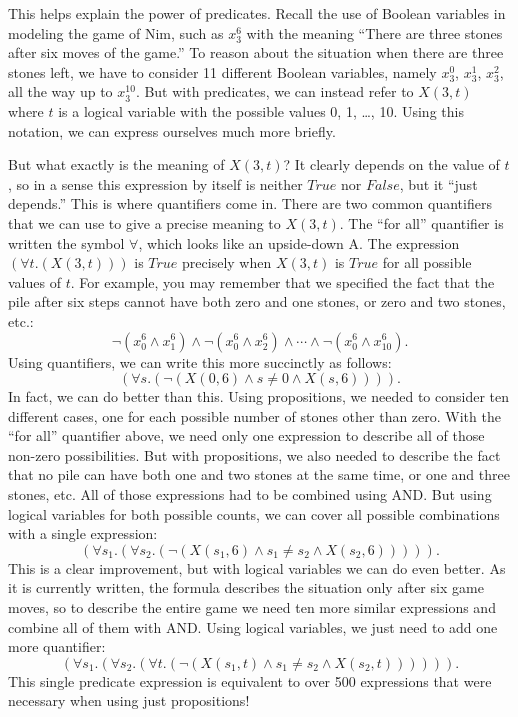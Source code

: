 This helps explain the power of predicates. Recall the use of Boolean variables in modeling the game of Nim, such as $x_{3}^{6}$
with the meaning ``There are three stones after six moves of the game.'' To reason about the situation when there are three
stones left, we have to consider 11 different Boolean variables, namely $x_{3}^{0}$, $x_{3}^{1}$, $x_{3}^{2}$, all the way 
up to $x_{3}^{10}$. But with predicates, we can instead refer to $X(3, t)$ where $t$ is a logical variable with the possible
values 0, 1, \dots, 10. Using this notation, we can express ourselves much more briefly.

But what exactly is the meaning of $X(3, t)$? It clearly depends on the value of $t$, so in a sense this expression by
itself is neither $True$ nor $False$, but it ``just depends.'' This is where quantifiers come in. There are two common
quantifiers that we can use to give a precise meaning to $X(3, t)$. The ``for all'' quantifier is written the symbol
$\forall$, which looks like an upside-down A. The expression $(\forall t.(X(3, t)))$ is $True$ precisely when $X(3, t)$
is $True$ for all possible values of $t$. 
For example, you may remember that we specified the fact that the pile after six steps
cannot have both zero and one stones, or zero and two stones, etc.:
$$\neg(x_{0}^{6} \wedge x_{1}^{6}) \wedge \neg(x_{0}^{6} \wedge x_{2}^{6}) \wedge \cdots \wedge \neg(x_{0}^{6} \wedge x_{10}^{6}).$$
Using quantifiers, we can write this more succinctly as follows:
$$(\forall s.(\neg(X(0, 6) \wedge s\ne0 \wedge X(s, 6)))).$$
In fact, we can do better than this. Using propositions, we needed to consider ten
different cases, one for each possible number of stones other than zero. With the 
``for all'' quantifier above, we need only one expression to describe all of those 
non-zero possibilities. But with propositions, we also needed to describe the fact
that no pile can have both one and two stones at the same time, or one and three
stones, etc.  All of those expressions had to be combined using AND. But using
logical variables for both possible counts, we can cover all possible combinations 
with a single expression:
$$(\forall s_1.(\forall s_2.(\neg(X(s_1, 6) \wedge s_1 \ne s_2 \wedge X(s_2, 6))))).$$
This is a clear improvement, but with logical variables we can do even better. As it
is currently written, the formula describes the situation only after six game moves,
so to describe the entire game we need ten more similar expressions and combine all
of them with AND. Using logical variables, we just need to add one more quantifier:
$$(\forall s_1.(\forall s_2.(\forall t.(\neg(X(s_1, t) \wedge s_1 \ne s_2 \wedge X(s_2, t)))))).$$
This single predicate expression is equivalent to over 500 expressions that were
necessary when using just propositions!

